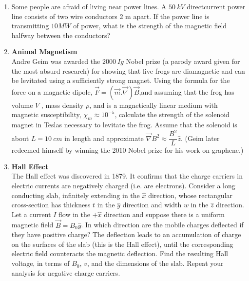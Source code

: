 \documentclass[fleqn]{article}
\begin{document}
  \begin{enumerate}
    \item Some people are afraid of living near power lines.  A $50 ~ kV$ directcurrent power line consists of two wire conductors 2 m apart. If the
    power line is transmitting $10 MW$ of power, what is the strength of the
    magnetic field halfway between the conductors?


    \item \textbf{Animal Magnetism}
    \\
    Andre Geim was awarded the $2000 ~ Ig$ Nobel prize (a parody award given for the most absurd research) for showing that live frogs are
    diamagnetic and can be levitated using a sufficiently strong magnet. Using the formula for the force on a magnetic dipole, 
    $\overrightarrow{F}=\left(
      \overrightarrow{m}.\overrightarrow{\nabla}
    \right)\overrightarrow{B}$,and assuming that the frog has volume $V$ , mass density $\rho$, and is a magnetically linear medium with 
    magnetic susceptibility, $\chi_m \approx 10^{-5}$, calculate the strength of the solenoid magnet in Teslas necessary to
    levitate the frog. Assume that the solenoid is about $L=10 ~ cm$ in
    length and approximate $\overrightarrow{\nabla} B^2 \approx \dfrac{B^2}{L} \hat{z}$. (Geim later redeemed himself
    by winning the 2010 Nobel prize for his work on graphene.)


    \item \textbf{Hall Effect}
    \\
    The Hall effect was discovered in 1879. It confirms that the charge carriers in electric currents are negatively charged (i.e. are electrons).
    Consider a long conducting slab, infinitely extending in the $\hat{x}$ direction, whose rectangular cross-section has thickness $t$ in 
    the $\hat{y}$ direction and width $w$ in the $\hat{z}$ direction. Let a current $I$ flow in the $+\hat{x}$ direction
    and suppose there is a uniform magnetic field $\overrightarrow{B}=B_0 \hat{y}$. In which direction are the mobile charges deflected if they 
    have positive charge? The deflection leads to an accumulation of charge on the surfaces of the slab (this is the Hall effect), until the 
    corresponding electric field counteracts the magnetic deflection. Find the resulting Hall voltage, in terms of $B_0$, $v$, and the dimensions
    of the slab. Repeat your analysis for negative charge carriers.


\end{enumerate}
\end{document}
